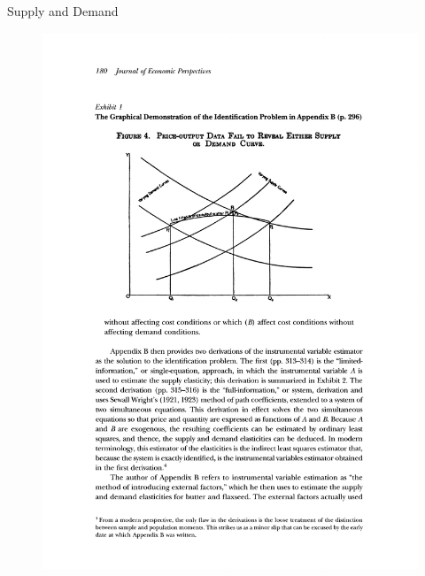 \documentclass{beamer}
\begin{document}
\begin{frame}{Supply and Demand}
	
	\begin{figure}
	\includegraphics[scale=0.72]{./lecture_includes/supply_demand.pdf}
	\end{figure}
\end{frame}
\end{document}
